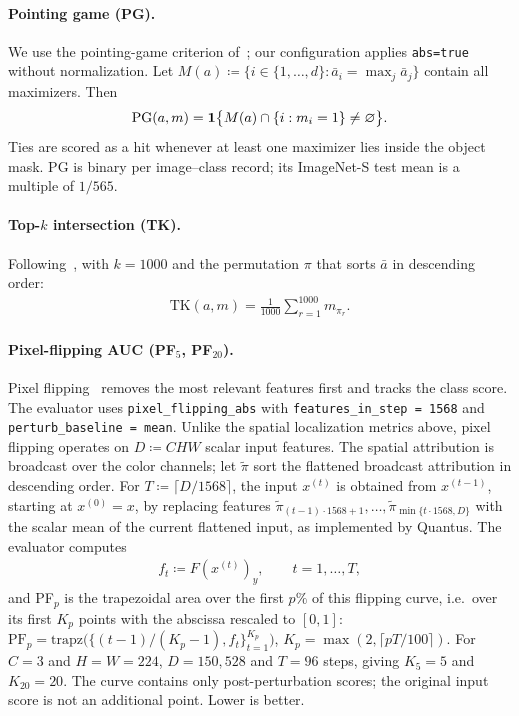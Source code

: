 \paragraph{Pointing game (PG).} We use the pointing-game criterion of~\textcite{Zhang2018pointinggame}; our configuration applies \texttt{abs=true} without normalization. Let $M(a) \coloneqq \{i \in \{1, \dots, d\} :
    \bar{a}_i = \max_j \bar{a}_j\}$ contain all maximizers. Then
\begin{align}
    \text{PG}(a, m) = \mathbf{1}\bigl\{M(a) \cap \{i : m_i = 1\} \neq \varnothing\bigr\}.
\end{align}
Ties are scored as a hit whenever at least one maximizer lies inside the object mask. PG is binary per image--class record; its ImageNet-S test mean is a multiple of $1/565$.

\paragraph{Top-$k$ intersection (TK).} Following~\textcite{Theiner2021}, with $k = 1000$ and the permutation $\pi$ that sorts
$\bar{a}$ in descending order:
\begin{align}
    \text{TK}(a, m) = \frac{1}{1000} \sum_{r=1}^{1000} m_{\pi_r}.
\end{align}

\paragraph{Pixel-flipping AUC (PF$_5$, PF$_{20}$).} Pixel flipping~\parencite{Bach2015,Samek2017evaluating} removes the most relevant features first
and tracks the class score. The evaluator uses \texttt{pixel\_flipping\_abs} with
\texttt{features\_in\_step = 1568} and \texttt{perturb\_baseline = mean}. Unlike the spatial
localization metrics above, pixel flipping operates on $D \coloneqq CHW$ scalar input features.
The spatial attribution is broadcast over the color channels; let $\widetilde\pi$ sort the
flattened broadcast attribution in descending order. For $T \coloneqq \lceil D/1568 \rceil$, the
input $x^{(t)}$ is obtained from $x^{(t-1)}$, starting at $x^{(0)}=x$, by replacing features
$\widetilde\pi_{(t-1)\cdot1568+1},\dots,\widetilde\pi_{\min\{t\cdot1568,D\}}$ with the scalar mean
of the current flattened input, as implemented by Quantus.
The evaluator computes
\begin{align}
    f_t \coloneqq F(x^{(t)})_y, \qquad t = 1, \dots, T,
\end{align}
and PF$_p$ is the trapezoidal area over the first $p\%$ of this flipping curve, i.e.\ over its
first $K_p$ points with the abscissa rescaled to $[0,1]$: $\text{PF}_p =
    \text{trapz}\bigl(\{(t-1)/(K_p-1), f_t\}_{t=1}^{K_p}\bigr)$, $K_p = \max(2, \lceil pT/100 \rceil)$.
For $C=3$ and $H=W=224$, $D=150{,}528$ and $T=96$ steps, giving $K_5=5$ and $K_{20}=20$.
The curve contains only post-perturbation scores; the original input score is not an additional
point. Lower is better.

